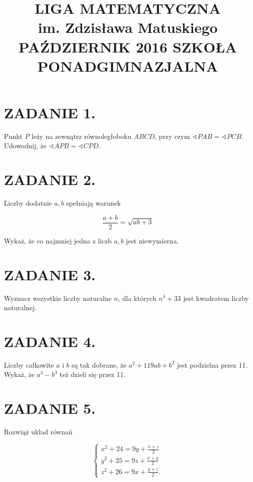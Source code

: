 \documentclass[10pt]{article}
\title{LIGA MATEMATYCZNA \\
 im. Zdzisława Matuskiego \\
 PAŹDZIERNIK 2016 SZKOŁA PONADGIMNAZJALNA }
\author{}
\date{}
\newcommand\varangle{\mathop{\sphericalangle}}
\begin{document}
\maketitle
\section*{ZADANIE 1.}
Punkt \(P\) leży na zewnątrz równoległoboku \(A B C D\), przy czym \(\varangle P A B=\varangle P C B\). Udowodnij, że \(\varangle A P B=\varangle C P D\).

\section*{ZADANIE 2.}
Liczby dodatnie \(a, b\) spełniają warunek

\[
\frac{a+b}{2}=\sqrt{a b+3}
\]

Wykaż, że co najmniej jedna z liczb \(a, b\) jest niewymierna.

\section*{ZADANIE 3.}
Wyznacz wszystkie liczby naturalne \(n\), dla których \(n^{4}+33\) jest kwadratem liczby naturalnej.

\section*{ZADANIE 4.}
Liczby całkowite \(a\) i \(b\) są tak dobrane, że \(a^{2}+119 a b+b^{2}\) jest podzielna przez 11. Wykaż, że \(a^{3}-b^{3}\) też dzieli się przez 11.

\section*{ZADANIE 5.}
Rozwiąż układ równań

\[
\left\{\begin{array}{l}
x^{2}+24=9 y+\frac{x+z}{2} \\
y^{2}+25=9 z+\frac{x+y}{2} \\
z^{2}+26=9 x+\frac{y+z}{2} .
\end{array}\right.
\]
\end{document}
